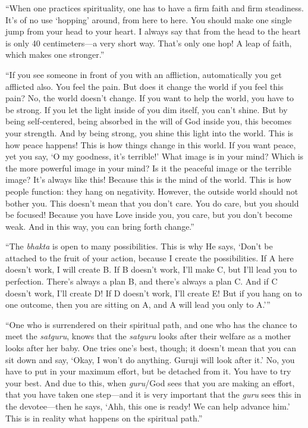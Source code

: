 \enquote{When one practices spirituality, one has to have a firm faith and firm steadiness. It’s of no use \enquote{hopping} around, from here to here. You should make one single jump from your head to your heart. I always say that from the head to the heart is only 40 centimeters---a very short way. That’s only one hop! A leap of faith, which makes one stronger.}

\enquote{If you see someone in front of you with an affliction, automatically you get afflicted also. You feel the pain. But does it change the world if you feel this pain? No, the world doesn’t change. If you want to help the world, you have to be strong. If you let the light inside of you dim itself, you can’t shine. But by being self-centered, being absorbed in the will of God inside you, this becomes your strength. And by being strong, you shine this light into the world. This is how peace happens! This is how things change in this world. If you want peace, yet you say, \enquote{O my goodness, it’s terrible!} What image is in your mind? Which is the more powerful image in your mind? Is it the peaceful image or the terrible image? It’s always like this! Because this is the mind of the world. This is how people function: they hang on negativity. However, the outside world should not bother you. This doesn’t mean that you don’t care. You do care, but you should be focused! Because you have Love inside you, you care, but you don’t become weak. And in this way, you can bring forth change.}

\enquote{The \textit{bhakta} is open to many possibilities. This is why He says, \enquote{Don’t be attached to the fruit of your action, because I create the possibilities. If A here doesn’t work, I will create B. If B doesn’t work, I’ll make C, but I’ll lead you to perfection. There’s always a plan B, and there’s always a plan C. And if C doesn’t work, I’ll create D! If D doesn’t work, I’ll create E! But if you hang on to one outcome, then you are sitting on A, and A will lead you only to A.}}

\enquote{One who is surrendered on their spiritual path, and one who has the chance to meet the \textit{satguru}, knows that the \textit{satguru} looks after their welfare as a mother looks after her baby. One tries one’s best, though; it doesn’t mean that you can sit down and say, \enquote{Okay, I won’t do anything. Guruji will look after it.} No, you have to put in your maximum effort, but be detached from it. You have to try your best. And due to this, when \textit{guru}/God sees that you are making an effort, that you have taken one step---and it is very important that the \textit{guru} sees this in the devotee---then he says, \enquote{Ahh, this one is ready! We can help advance him.} This is in reality what happens on the spiritual path.}

